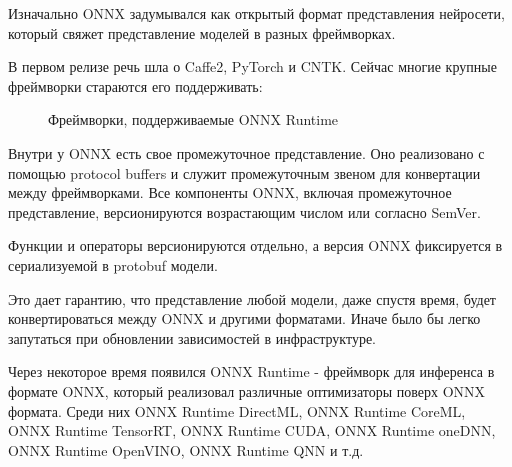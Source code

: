 \documentclass[a4paper,14pt]{extreport}
\begin{document}
        Изначально ONNX задумывался как открытый формат представления нейросети, который свяжет представление моделей в разных фреймворках.
        
        В первом релизе речь шла о Caffe2, PyTorch и CNTK. Сейчас многие крупные фреймворки стараются его поддерживать:

        \begin{figure}[h]
            \caption{Фреймворки, поддерживаемые ONNX Runtime}
            \label{ris:onnxruntime}
        \end{figure}

        Внутри у ONNX есть свое промежуточное представление. Оно реализовано с помощью protocol buffers и служит промежуточным звеном для конвертации между фреймворками. Все компоненты ONNX, включая промежуточное представление, версионируются возрастающим числом или согласно SemVer.
        
        Функции и операторы версионируются отдельно, а версия ONNX фиксируется в сериализуемой в protobuf модели.
        
        Это дает гарантию, что представление любой модели, даже спустя время, будет конвертироваться между ONNX и другими форматами. Иначе было бы легко запутаться при обновлении зависимостей в инфраструктуре.

        Через некоторое время появился ONNX Runtime - фреймворк для инференса в формате ONNX, который реализовал различные оптимизаторы поверх ONNX формата. Среди них ONNX Runtime DirectML, ONNX Runtime CoreML, ONNX Runtime TensorRT, ONNX Runtime CUDA, ONNX Runtime oneDNN, ONNX Runtime OpenVINO, ONNX Runtime QNN и т.д.
\end{document}
